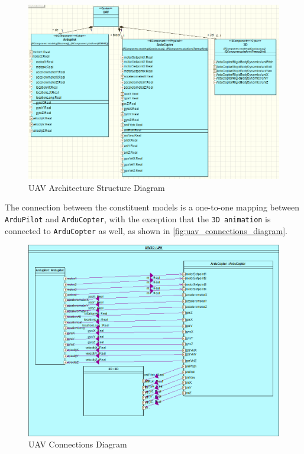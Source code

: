 		\begin{figure}[htbp]
			\centering
			\includegraphics[width=\linewidth]{uavsingle/architecture_diagram.png}
			\caption{UAV Architecture Structure Diagram}
			\label{fig:uav_architecture_diagram}
		\end{figure}

		The connection between the constituent models is a one-to-one mapping between \texttt{ArduPilot} and \texttt{ArduCopter}, with the exception that the \texttt{3D animation} is connected to \texttt{ArduCopter} as well, as shown in \autoref{fig:uav_connections_diagram}.
		

		\begin{figure}[htbp]
			\centering
			\includegraphics[width=\linewidth]{uavsingle/connections_diagram_3d.png}
			\caption{UAV Connections Diagram}
			\label{fig:uav_connections_diagram}
		\end{figure}


